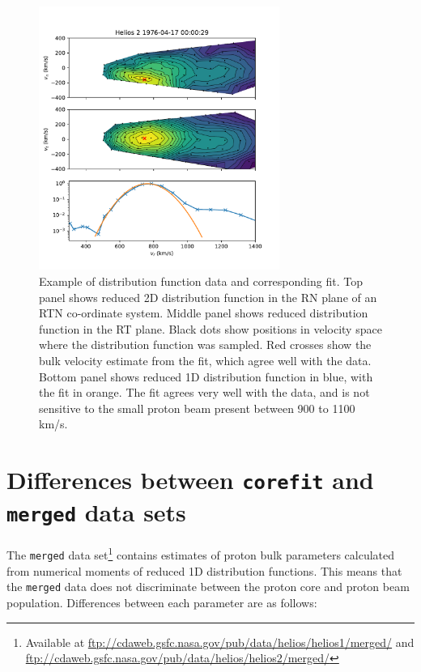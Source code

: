 \documentclass[11pt,a4paper]{article}
\begin{document}
\begin{figure}
	\centering
	\includegraphics[width=0.7\textwidth]{I3_3D_example}
	\caption{Example of distribution function data and corresponding fit. Top panel shows reduced 2D distribution function in the RN plane of an RTN co-ordinate system. Middle panel shows reduced distribution function in the RT plane. Black dots show positions in velocity space where the distribution function was sampled. Red crosses show the bulk velocity estimate from the fit, which agree well with the data. Bottom panel shows reduced 1D distribution function in blue, with the fit in orange. The fit agrees very well with the data, and is not sensitive to the small proton beam present between 900 to 1100 km/s.}
	\label{fig:distribution fit}
\end{figure}

\section{Differences between \texttt{corefit} and \texttt{merged} data sets}
The \texttt{merged} data set\footnote{Available at \url{ftp://cdaweb.gsfc.nasa.gov/pub/data/helios/helios1/merged/} and \url{ftp://cdaweb.gsfc.nasa.gov/pub/data/helios/helios2/merged/}} contains estimates of proton bulk parameters calculated from numerical moments of reduced 1D distribution functions. This means that the \texttt{merged} data does not discriminate between the proton core and proton beam population. Differences between each parameter are as follows:
\end{document}
